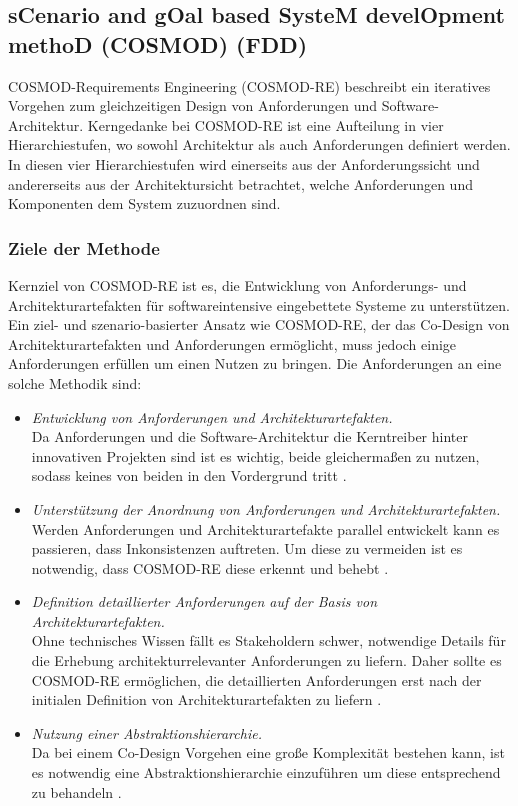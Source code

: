 \subsection{sCenario and gOal based SysteM develOpment methoD (COSMOD) (FDD)}\label{scgo}
COSMOD-Requirements Engineering (COSMOD-RE) beschreibt ein iteratives Vorgehen zum gleichzeitigen Design von Anforderungen und Software-Architektur. Kerngedanke bei COSMOD-RE ist eine Aufteilung in vier Hierarchiestufen, wo sowohl Architektur als auch Anforderungen definiert werden. In diesen vier Hierarchiestufen wird einerseits aus der Anforderungssicht und andererseits aus der Architektursicht betrachtet, welche Anforderungen und Komponenten dem System zuzuordnen sind.\\

\subsubsection{Ziele der Methode}
Kernziel von COSMOD-RE ist es, die Entwicklung von Anforderungs- und Architekturartefakten f\"ur softwareintensive eingebettete Systeme zu unterst\"utzen. Ein ziel- und szenario-basierter Ansatz wie COSMOD-RE, der das Co-Design von Architekturartefakten und Anforderungen erm\"oglicht, muss jedoch einige Anforderungen erf\"ullen um einen Nutzen zu bringen. Die Anforderungen an eine solche Methodik sind: \cite{Poh02}\\
 
\begin{itemize}
\item \emph{Entwicklung von Anforderungen und Architekturartefakten.} \\
Da Anforderungen und die Software-Architektur die Kerntreiber hinter innovativen Projekten sind ist es wichtig, beide gleicherma\ss{}en zu nutzen, sodass keines von beiden in den Vordergrund tritt \cite{Poh02}.
\item \emph{Unterst\"utzung der Anordnung von Anforderungen und Architekturartefakten.} \\
Werden Anforderungen und Architekturartefakte parallel entwickelt kann es passieren, dass Inkonsistenzen auftreten. Um diese zu vermeiden ist es notwendig, dass COSMOD-RE diese erkennt und behebt \cite{Poh02}.
\item \emph{Definition detaillierter Anforderungen auf der Basis von Architekturartefakten.} \\
Ohne technisches Wissen f\"allt es Stakeholdern schwer, notwendige Details f\"ur die Erhebung architekturrelevanter Anforderungen zu liefern. Daher sollte es COSMOD-RE erm\"oglichen, die detaillierten Anforderungen erst nach der initialen Definition von Architekturartefakten zu liefern \cite{Poh02}. 
\item \emph{Nutzung einer Abstraktionshierarchie.} \\
Da bei einem Co-Design Vorgehen eine gro\ss{}e Komplexit\"at bestehen kann, ist es notwendig eine Abstraktionshierarchie einzuf\"uhren um diese entsprechend zu behandeln \cite{Poh02}.\\
\end{itemize}

